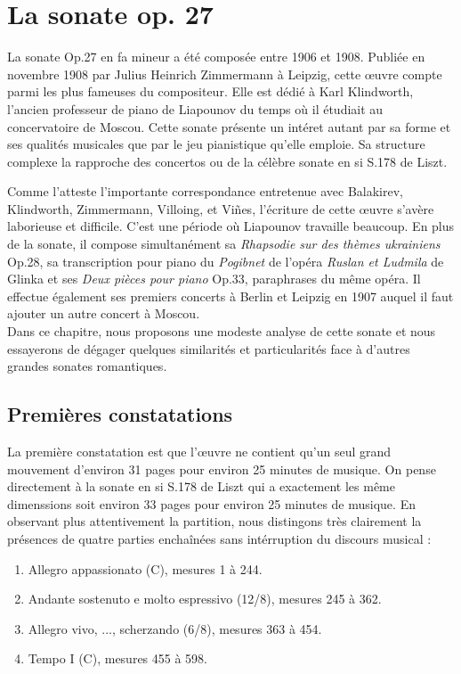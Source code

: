 
\chapter{La sonate op. 27}

La sonate Op.27 en fa mineur a été composée entre 1906 et 1908. Publiée en novembre 1908 par Julius Heinrich Zimmermann à Leipzig, cette œuvre compte parmi les plus fameuses du compositeur. Elle est dédié à Karl Klindworth, l'ancien professeur de piano de Liapounov du temps où il étudiait au concervatoire de Moscou. Cette sonate présente un intéret autant par sa forme et ses qualités musicales que par le jeu pianistique qu'elle emploie. Sa structure complexe la rapproche des concertos ou de la célèbre sonate en si S.178 de Liszt.

Comme l'atteste l'importante correspondance entretenue avec Balakirev, Klindworth, Zimmermann, Villoing, et Viñes, l'écriture de cette œuvre s'avère laborieuse et difficile. C'est une période où Liapounov travaille beaucoup. En plus de la sonate, il compose simultanément sa \emph{Rhapsodie sur des thèmes ukrainiens} Op.28, sa transcription pour piano du \emph{Pogibnet} de l'opéra \emph{Ruslan et Ludmila} de Glinka et ses \emph{Deux pièces pour piano} Op.33, paraphrases du même opéra. Il effectue également ses premiers concerts à Berlin et Leipzig en 1907 auquel il faut ajouter un autre concert à Moscou.\\

Dans ce chapitre, nous proposons une modeste analyse de cette sonate et nous essayerons de dégager quelques similarités et particularités face à d'autres grandes sonates romantiques.

\section{Premières constatations}

La première constatation est que l'œuvre ne contient qu'un seul grand mouvement d'environ 31 pages pour environ 25 minutes de musique. On pense directement à la sonate en si S.178 de Liszt qui a exactement les même dimenssions soit environ 33 pages pour environ 25 minutes de musique. En observant plus attentivement la partition, nous distingons très clairement la présences de quatre parties enchaînées sans intérruption du discours musical :
\begin{enumerate}
  \item Allegro appassionato (C), mesures 1 à 244.
  \item Andante sostenuto e molto espressivo (12/8), mesures 245 à 362.
  \item Allegro vivo, ..., scherzando (6/8), mesures 363 à 454.
  \item Tempo I (C), mesures 455 à 598.\\
\end{enumerate}

